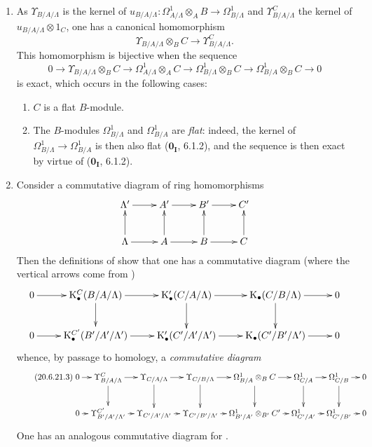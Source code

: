 \begin{remarks}[20.6.21]
\label{0.20.6.21}
\begin{enumerate}
  \item[\rm(i)] As $\Upsilon_{B/A/\Lambda}$ is the kernel of $u_{B/A/\Lambda}:\Omega^1_{A/\Lambda}\otimes_A B\to\Omega^1_{B/\Lambda}$ and $\Upsilon^C_{B/A/\Lambda}$ the kernel of $u_{B/A/\Lambda}\otimes 1_C$, one has a canonical homomorphism
\begin{equation}
\tag{20.6.21.1}
  \label{0.20.6.21.1}
  \Upsilon_{B/A/\Lambda}\otimes_B C\to\Upsilon^C_{B/A/\Lambda}.
\end{equation}
This homomorphism is bijective when the sequence
\begin{equation}
\tag{20.6.21.2}
  \label{0.20.6.21.2}
  0\to\Upsilon_{B/A/\Lambda}\otimes_B C\to\Omega^1_{A/\Lambda}\otimes_A C\to\Omega^1_{B/\Lambda}\otimes_B C\to\Omega^1_{B/A}\otimes_B C\to 0
\end{equation}
is exact, which occurs in the following cases:
\begin{enumerate}
  \item[$1^\circ$] $C$ is a flat $B$-module.
  \item[$2^\circ$] The $B$-modules $\Omega^1_{B/\Lambda}$ and $\Omega^1_{B/A}$ are \emph{flat}: indeed, the kernel of $\Omega^1_{B/\Lambda}\to\Omega^1_{B/A}$ is then also flat ($\mathbf{0_I}$, 6.1.2), and the sequence  is then exact by virtue of ($\mathbf{0_I}$, 6.1.2).
\end{enumerate}
  \item[\rm(ii)] Consider a commutative diagram of ring homomorphisms
\[
\xymatrix{
  \Lambda' \ar[r] & A' \ar[r] & B' \ar[r] & C' \\
  \Lambda \ar[u] \ar[r] & A \ar[u] \ar[r] & B \ar[u] \ar[r] & C \ar[u]
}
\]
Then the definitions of  show that one has a commutative diagram (where the vertical arrows come from )
\[
\xymatrix{
  0 \ar[r] & \mathrm{K}^C_\bullet(B/A/\Lambda) \ar[r] \ar[d] & \mathrm{K}'_\bullet(C/A/\Lambda) \ar[r] \ar[d] & \mathrm{K}_\bullet(C/B/\Lambda) \ar[r] \ar[d] & 0 \\
  0 \ar[r] & \mathrm{K}^{C'}_\bullet(B'/A'/\Lambda') \ar[r] & \mathrm{K}'_\bullet(C'/A'/\Lambda') \ar[r] & \mathrm{K}_\bullet(C'/B'/\Lambda') \ar[r] & 0
}
\]
whence, by passage to homology, a \emph{commutative diagram}
\begin{equation}
\tag{20.6.21.3}
  \label{0.20.6.21.3}
\xymatrix@C=0.7em{
  0 \ar[r] & \Upsilon^C_{B/A/\Lambda} \ar[r] \ar[d] & \Upsilon_{C/A/\Lambda} \ar[r] \ar[d] & \Upsilon_{C/B/\Lambda} \ar[r] \ar[d] & \Omega^1_{B/A}\otimes_B C \ar[r] \ar[d] & \Omega^1_{C/A} \ar[r] \ar[d] & \Omega^1_{C/B} \ar[r] \ar[d] & 0 \\
  0 \ar[r] & \Upsilon^{C'}_{B'/A'/\Lambda'} \ar[r] & \Upsilon_{C'/A'/\Lambda'} \ar[r] & \Upsilon_{C'/B'/\Lambda'} \ar[r] & \Omega^1_{B'/A'}\otimes_{B'} C' \ar[r] & \Omega^1_{C'/A'} \ar[r] & \Omega^1_{C'/B'} \ar[r] & 0
}
\end{equation}
One has an analogous commutative diagram for .
\end{enumerate}
\end{remarks}

